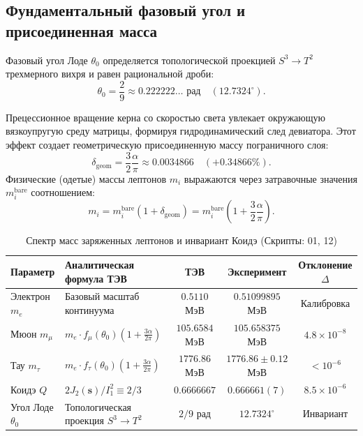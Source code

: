 \documentclass[12pt,a4paper]{article}
\theoremstyle{definition}
\theoremstyle{remark}
\begin{document}
\subsection{Фундаментальный фазовый угол и присоединенная масса}
Фазовый угол Лоде $\theta_0$ определяется топологической проекцией $S^3 \to T^2$ трехмерного вихря и равен рациональной дроби:
\begin{equation}
	\theta_0 = \frac{2}{9} \approx 0.222222\dots \text{ рад} \quad (12.7324^\circ).
	\label{eq:lode_angle_value}
\end{equation}

Прецессионное вращение керна со скоростью света увлекает окружающую вязкоупругую среду матрицы, формируя гидродинамический след девиатора. Этот эффект создает геометрическую присоединенную массу пограничного слоя:
\begin{equation}
	\delta_{\mathrm{geom}} = \frac{3}{2}\frac{\alpha}{\pi} \approx 0.0034866 \quad (+0.34866\%).
	\label{eq:attached_mass}
\end{equation}
Физические (одетые) массы лептонов $m_i$ выражаются через затравочные значения $m_i^{\mathrm{bare}}$ соотношением:
\begin{equation}
	m_i = m_i^{\mathrm{bare}} \left( 1 + \delta_{\mathrm{geom}} \right) = m_i^{\mathrm{bare}} \left( 1 + \frac{3}{2}\frac{\alpha}{\pi} \right).
	\label{eq:dressed_mass_formula}
\end{equation}

\begin{table}[htbp]
	\centering
	\small
	\caption{Спектр масс заряженных лептонов и инвариант Коидэ (Скрипты: 01, 12)}
	\label{tab:leptons}
	\vspace{2mm}
	\begin{tabularx}{\textwidth}{l Y c c c}
	\toprule
	\textbf{Параметр} & \textbf{Аналитическая формула ТЭВ} & \textbf{ТЭВ} & \textbf{Эксперимент} & \textbf{Отклонение $\Delta$} \\
	\midrule
	Электрон $m_e$ & Базовый масштаб континуума & $0.5110$ МэВ & $0.51099895$ МэВ & Калибровка \\
	Мюон $m_\mu$ & $m_e \cdot f_\mu(\theta_0) \left(1 + \frac{3\alpha}{2\pi}\right)$ & $105.6584$ МэВ & $105.658375$ МэВ & $4.8 \times 10^{-8}$ \\
	Тау $m_\tau$ & $m_e \cdot f_\tau(\theta_0) \left(1 + \frac{3\alpha}{2\pi}\right)$ & $1776.86$ МэВ & $1776.86 \pm 0.12$ МэВ & $< 10^{-6}$ \\
	Коидэ $Q$ & $2J_2(\mathbf{s}) / I_1^2 \equiv 2/3$ & $0.6666667$ & $0.666661(7)$ & $8.5 \times 10^{-6}$ \\
	Угол Лоде $\theta_0$ & Топологическая проекция $S^3 \to T^2$ & $2/9$ рад & $12.7324^\circ$ & Инвариант \\
	\bottomrule
\end{tabularx}
\end{table}
\end{document}
